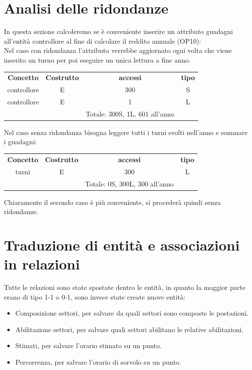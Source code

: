 \section{Analisi delle ridondanze}
In questa sezione calcoleremo se è conveniente inserire un attributo guadagni all'entità controllore al fine di calcolare il reddito annuale (OP10):\\
Nel caso con ridondanza l'attributo verrebbe aggiornato ogni volta che viene inserito un turno per poi eseguire un unica lettura a fine anno.
\begin{table}[H]
     \centering
     \begin{tabular}{cccc}
   
     \rowcolor{tableheadercolor}
     \textbf{Concetto} & \textbf{Costrutto} & \textbf{accessi} & \textbf{tipo}\\
   
     controllore & E & 300 & S \\
     controllore & E & 1 & L \\
     & & Totale: 300S, 1L, 601 all'anno &\\
   
     \end{tabular}
     \end{table}
Nel caso senza ridondanza bisogna leggere tutti i turni svolti nell'anno e sommare i guadagni:
\begin{table}[H]
     \centering
     \begin{tabular}{cccc}
   
     \rowcolor{tableheadercolor}
     \textbf{Concetto} & \textbf{Costrutto} & \textbf{accessi} & \textbf{tipo}\\
   
     turni & E & 300 & L \\
     & & Totale: 0S, 300L, 300 all'anno &\\
   
     \end{tabular}
     \end{table}

Chiaramente il secondo caso è più conveniente, si procederà quindi senza ridondanze.


\section{Traduzione di entità e associazioni in relazioni}
Tutte le relazioni sono state spostate dentro le entità, in quanto la maggior parte erano di tipo 1-1 o 0-1,
sono invece state create nuove entità:
\begin{itemize}
  \item Composizione settori, per salvare da quali settori sono composte le postazioni.
  \item Abilitazione settori, per salvare quali settori abilitano le relative abilitazioni.
  \item Stimati, per salvare l'orario stimato su un punto.
  \item Percorrenza, per salvare l'orario di sorvolo su un punto.
\end{itemize}

